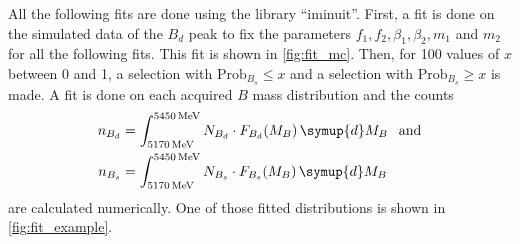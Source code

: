 All the following fits are done using the library \enquote{iminuit}\cite{iminuit}.
First, a fit is done on the simulated data of the $B_d$ peak to fix the parameters $f_1,f_2,\beta_1,\beta_2,m_1$ and $m_2$ for all the following fits. 
This fit is shown in \cref{fig:fit_mc}.
Then, for 100 values of $x$ between 0 and 1, a selection with $\text{Prob}_{B_s} \leq x$ and a selection with $\text{Prob}_{B_s} \geq x$ is made.
A fit is done on each acquired $B$ mass distribution and the counts
\begin{align}
    n_{B_d} &= \int_{\qty{5170}{\MeV}}^{\qty{5450}{\MeV}} N_{B_d} \cdot F_{B_d}(M_B) \, \symup{d}M_B \:\:\text{ and} \\
    n_{B_s} &= \int_{\qty{5170}{\MeV}}^{\qty{5450}{\MeV}} N_{B_s} \cdot F_{B_s}(M_B) \, \symup{d}M_B
\end{align}
are calculated numerically.
One of those fitted distributions is shown in \cref{fig:fit_example}.

